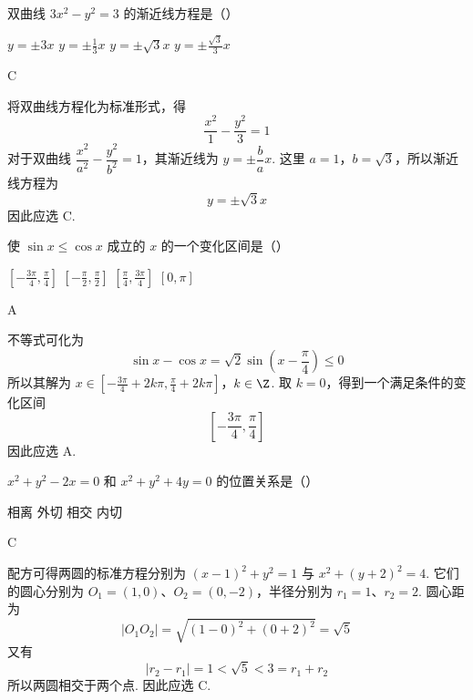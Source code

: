 \documentclass[UTF8,a4paper,oneside,11pt]{ctexbook}
\begin{document}
\begin{problem}
双曲线 \(3x^{2} - y^{2} = 3\) 的渐近线方程是（\quad）

\choices
    {\(y = \pm 3x\)}
    {\(y = \pm \frac{1}{3} x\)}
    {\(y = \pm \sqrt{3} x\)}
    {\(y = \pm \frac{\sqrt{3}}{3} x\)}
\end{problem}

\begin{answer}
C
\end{answer}

\begin{solution}
将双曲线方程化为标准形式，得
\[
\frac{x^2}{1}-\frac{y^2}{3}=1
\]
对于双曲线 \(\dfrac{x^2}{a^2}-\dfrac{y^2}{b^2}=1\)，其渐近线为 \(y=\pm\dfrac{b}{a}x\). 这里 \(a=1\)，\(b=\sqrt3\)，所以渐近线方程为
\[
y=\pm\sqrt3 x
\]
因此应选 C.
\end{solution}

\begin{problem}
使 \(\sin x \leqslant \cos x\) 成立的 \(x\) 的一个变化区间是（\quad）

\choices
    {\(\left[-\frac{3\pi}{4}, \frac{\pi}{4}\right]\)}
    {\(\left[-\frac{\pi}{2}, \frac{\pi}{2}\right]\)}
    {\(\left[\frac{\pi}{4}, \frac{3\pi}{4}\right]\)}
    {\([0, \pi]\)}
\end{problem}

\begin{answer}
A
\end{answer}

\begin{solution}
不等式可化为
\[
\sin x-\cos x=\sqrt2\sin\left(x-\frac{\pi}{4}\right)\leqslant0
\]
所以其解为
\(x\in\left[-\frac{3\pi}{4}+2k\pi,\frac{\pi}{4}+2k\pi\right]\)，\(k\in\Z\).
取 \(k=0\)，得到一个满足条件的变化区间
\[
\left[-\frac{3\pi}{4},\frac{\pi}{4}\right]
\]
因此应选 A.
\end{solution}

\begin{problem}
\(x^{2} + y^{2} - 2x = 0\) 和 \(x^{2} + y^{2} + 4y = 0\) 的位置关系是（\quad）

\choices
    {相离}
    {外切}
    {相交}
    {内切}
\end{problem}

\begin{answer}
C
\end{answer}

\begin{solution}
配方可得两圆的标准方程分别为 \((x-1)^2+y^2=1\) 与 \(x^2+(y+2)^2=4\).
它们的圆心分别为 \(O_1=(1,0)\)、\(O_2=(0,-2)\)，半径分别为 \(r_1=1\)、\(r_2=2\). 圆心距为
\[
|O_1O_2|=\sqrt{(1-0)^2+(0+2)^2}=\sqrt5
\]
又有
\[
|r_2-r_1|=1<\sqrt5<3=r_1+r_2
\]
所以两圆相交于两个点. 因此应选 C.
\end{solution}
\end{document}
